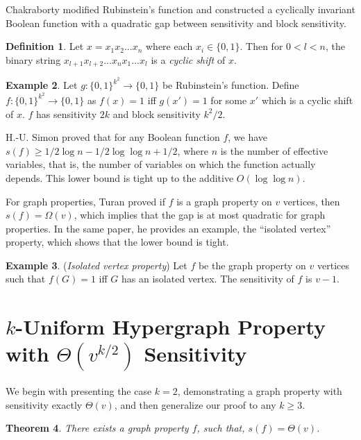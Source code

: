 \documentclass[psamsfonts]{amsart}
\newtheorem{theorem}{Theorem}[section]
\theoremstyle{definition}
\newtheorem{defn}[theorem]{Definition}
\newtheorem{exmp}[theorem]{Example}
\theoremstyle{remark}
\numberwithin{equation}{section}
\begin{document}
	Chakraborty modified Rubinstein's function and constructed a cyclically invariant Boolean function with a quadratic gap between sensitivity and block sensitivity.
\begin{defn} Let $x = x_1x_2...x_n$ where each $x_i \in \{0,1\}$. Then for $0 < l < n$, the binary string $x_{l+1}x_{l+2}...x_nx_1...x_l$ is a {\it cyclic shift} of $x$.
\end{defn}

	\begin{exmp}
		Let $g : \{0,1\}^{k^2} \rightarrow \{0,1\}$ be Rubinstein's function. Define $f : \{0,1\}^{k^2} \rightarrow \{0,1\}$ as $f(x) = 1$ iff $g(x') = 1$ for some $x'$ which is a cyclic shift of $x$. $f$ has sensitivity $2k$ and block sensitivity $k^2/2$.
	\end{exmp}

	H.-U. Simon \cite{S} proved that for any Boolean function $f$, we have $s(f) \geq 1/2\log n -1/2\log{\log n} + 1/2$, where $n$ is the number of effective variables, that is, the number of variables on which the function actually depends. This lower bound is tight up to the additive  $O(\log{\log n})$.

	For graph properties, Turan \cite{T} proved if $f$ is a graph property on $v$ vertices, then $s(f) = \Omega(v)$, which implies that the gap is at most quadratic for graph properties. In the same paper, he provides an example, the ``isolated vertex'' property, which shows that the lower bound is tight.

	\begin{exmp} ({\it Isolated vertex property}) 
		Let $f$ be the graph property on $v$ vertices such that $f(G) = 1$ iff $G$ has an isolated vertex. The sensitivity of $f$ is $v-1$.
	\end{exmp}
			
\section{$k$-Uniform  Hypergraph Property with $\Theta(v^{k/2})$ Sensitivity}
	We begin with presenting the case $k=2$, demonstrating a graph property with sensitivity exactly $\Theta(v)$, and then generalize our proof to any $k\geq 3$.

	\begin{theorem}
		There exists a graph property $f$, such that, $s(f) = \Theta(v)$.
	\end{theorem} 
\end{document}
